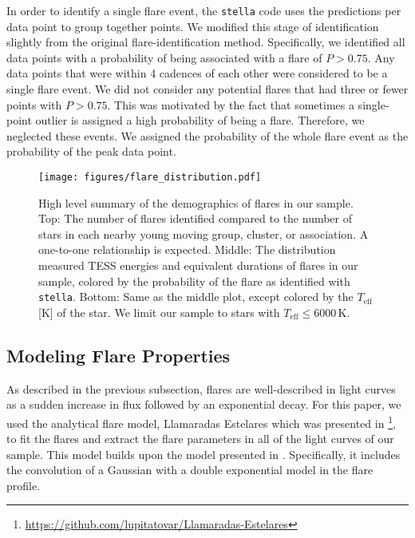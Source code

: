 \documentclass[twocolumn]{aastex631}
\begin{document}
In order to identify a single flare event, the \texttt{stella} code uses the predictions per data point to group together points. We modified this stage of identification slightly from the original flare-identification method. Specifically, we identified all data points with a probability of being associated with a flare of $P > 0.75$. Any data points that were within 4 cadences of each other were considered to be a single flare event. We did not consider any potential flares that had three or fewer points with $P > 0.75$. This was motivated by the fact that  sometimes a single-point outlier is assigned a high probability of being a flare. Therefore, we neglected these events. We assigned the probability of the whole flare event as the probability of the peak data point.

\begin{figure}[ht!]
    \begin{centering}
        \texttt{[image: figures/flare\_distribution.pdf]}
        \caption{
            High level summary of the demographics of flares in our sample. Top: The number of flares identified compared to the number of stars in each nearby young moving group, cluster, or association. A one-to-one relationship is expected. Middle: The distribution measured TESS energies
            and equivalent durations of flares in our sample, colored by the probability of the flare as identified with \texttt{stella}. Bottom: Same as the middle plot, except colored by the $T_\textrm{eff}$ [K] of the star. We limit our sample to stars with $T_\textrm{eff} \leq 6000$\,K.
        }
        \label{fig:flare_distribution}
    \end{centering}
\end{figure}


\subsection{Modeling Flare Properties}\label{subsec2:model}

As described in the previous subsection, flares are well-described in light curves as a sudden increase in flux followed by an exponential decay. For this paper, we used the analytical flare model, Llamaradas Estelares which was presented in
\cite{tovar22}\footnote{\url{https://github.com/lupitatovar/Llamaradas-Estelares}}, to fit the flares and extract the flare parameters in all of the light curves of our sample. This model builds upon the model presented in \cite{davenport14}. Specifically, it includes the convolution of a Gaussian with a double exponential model in the flare profile.
\end{document}
